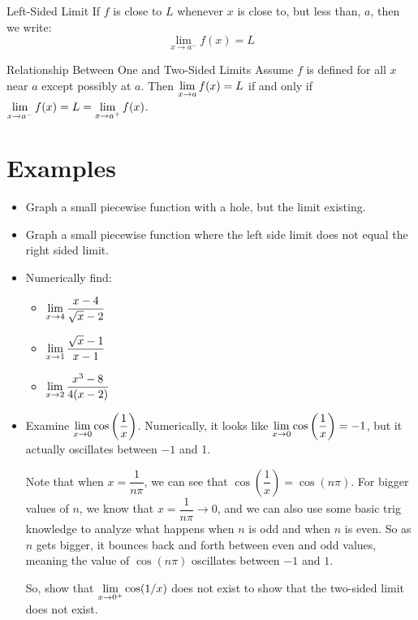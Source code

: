 \begin{defn}{Left-Sided Limit}
  If $f$ is close to $L$ whenever $x$ is close to, but less than, $a$, then we write:
  \[ \lim_{x\to a^-} f(x)=L\]
\end{defn}

\begin{thm}{Relationship Between One and Two-Sided Limits}
  Assume $f$ is defined for all $x$ near $a$ except possibly at $a$.
  Then $\displaystyle \lim_{x\to a} f(x) = L$ if and only if $\displaystyle \lim_{x\to a^-}f(x) = L = \displaystyle \lim_{x\to a^+} f(x)$.
\end{thm}

\section*{Examples}

\begin{itemize}
  \item Graph a small piecewise function with a hole, but the limit existing.
  \item Graph a small piecewise function where the left side limit does not equal the right sided limit.
  \item Numerically find:
  \begin{multicols}{3}
    \begin{itemize}
      \item $\displaystyle \lim_{x\to 4} \dfrac{x-4}{\sqrt{x}-2}$
      \item $\displaystyle \lim_{x\to 1} \dfrac{\sqrt{x}-1}{x-1}$
      \item $\displaystyle \lim_{x\to 2} \dfrac{x^3-8}{4(x-2)}$
    \end{itemize}
  \end{multicols}
  \item Examine $\displaystyle \lim_{x\to 0} \cos\left(\dfrac{1}{x}\right)$.
  Numerically, it looks like $\displaystyle \lim_{x\to 0} \cos\left(\dfrac{1}{x}\right)=-1$, but it actually oscillates between $-1$ and 1.

  Note that when $x=\dfrac{1}{n\pi}$, we can see that  $\cos\left(\dfrac{1}{x}\right)=\cos(n\pi)$.
  For bigger values of $n$, we know that $x=\dfrac{1}{n\pi} \to 0$, and we can also use some basic trig knowledge to analyze what happens when $n$ is odd and when $n$ is even.
  So as $n$ gets bigger, it bounces back and forth between even and odd values, meaning the value of $\cos(n\pi)$ oscillates between $-1$ and $1$.

  So, show that $\displaystyle \lim_{x\to0^+}\cos(1/x)$ does not exist to show that the two-sided limit does not exist.
\end{itemize}
